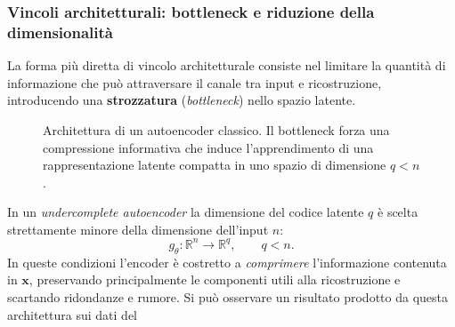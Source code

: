 \subsubsection{Vincoli architetturali: bottleneck e riduzione della dimensionalità}
\label{subsubsec:bottleneck}
La forma più diretta di vincolo architetturale consiste nel limitare la quantità
di informazione che può attraversare il canale tra input e ricostruzione,
introducendo una \textbf{strozzatura} (\textit{bottleneck}) nello spazio latente.
\begin{figure}[htbp]
    \centering
    \caption{Architettura di un autoencoder classico. Il bottleneck forza una compressione informativa che induce l'apprendimento di una rappresentazione latente compatta in uno spazio di dimensione $q<n$.}
    \label{fig:autoencoder_arch}
\end{figure}
In un \textit{undercomplete autoencoder} la dimensione del codice latente $q$ è
scelta strettamente minore della dimensione dell'input $n$:
\begin{equation}
    g_\theta : \mathbb{R}^n \rightarrow \mathbb{R}^q, \qquad q < n.
    \label{eq:ae_bottleneck}
\end{equation}
In queste condizioni l'encoder è costretto a \emph{comprimere} l'informazione
contenuta in $\mathbf{x}$, preservando principalmente le componenti utili alla
ricostruzione e scartando ridondanze e rumore. Si può osservare un risultato prodotto da questa architettura sui dati del 
